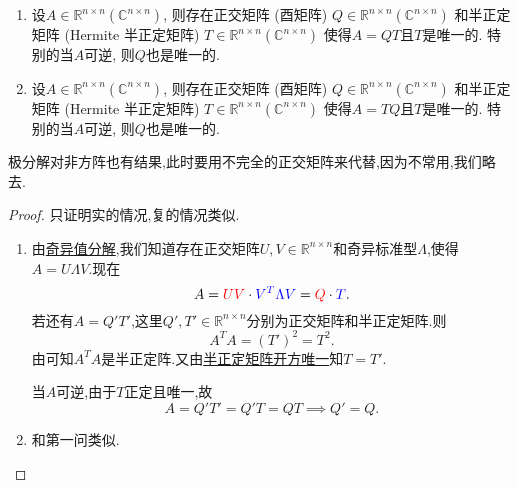 \documentclass[../../main.tex]{subfiles}
\begin{document}
\begin{theorem}[极分解]\label{theorem:极分解}
\begin{enumerate}
\item 设\( A \in \mathbb{R}^{n \times n} (\mathbb{C}^{n \times n}) \), 则存在正交矩阵 (酉矩阵) \( Q \in \mathbb{R}^{n \times n} (\mathbb{C}^{n \times n}) \) 和半正定矩阵 (Hermite 半正定矩阵) \( T \in \mathbb{R}^{n \times n} (\mathbb{C}^{n \times n}) \) 使得\( A = QT \)且\( T \)是唯一的. 特别的当\( A \)可逆, 则\( Q \)也是唯一的.

\item 设\( A \in \mathbb{R}^{n \times n} (\mathbb{C}^{n \times n}) \), 则存在正交矩阵 (酉矩阵) \( Q \in \mathbb{R}^{n \times n} (\mathbb{C}^{n \times n}) \) 和半正定矩阵 (Hermite 半正定矩阵) \( T \in \mathbb{R}^{n \times n} (\mathbb{C}^{n \times n}) \) 使得\( A = TQ \)且\( T \)是唯一的. 特别的当\( A \)可逆, 则\( Q \)也是唯一的.
\end{enumerate}
\end{theorem}
\begin{note}
极分解对非方阵也有结果,此时要用不完全的正交矩阵来代替,因为不常用,我们略去.
\end{note}
\begin{proof}
只证明实的情况,复的情况类似.
\begin{enumerate}
\item 由\hyperref[theorem:奇异值分解]{奇异值分解},我们知道存在正交矩阵\( U, V \in \mathbb{R}^{n \times n} \)和奇异标准型\( \Lambda \),使得\( A = U \Lambda V \).现在
\[
A = {\color{red} UV} \cdot {\color{blue} V^T \Lambda V} = {\color{red} Q} \cdot {\color{blue} T}.
\]
若还有\( A = Q'T' \),这里\( Q', T' \in \mathbb{R}^{n \times n} \)分别为正交矩阵和半正定矩阵.则
\[
A^T A = (T')^2 = T^2.
\]
由可知$A^TA$是半正定阵.又由\hyperref[theorem:半正定矩阵开方唯一]{半正定矩阵开方唯一}知\( T = T' \).

当\( A \)可逆,由于\( T \)正定且唯一,故
\[
A = Q'T' =Q'T= QT \implies Q' = Q.
\]

\item 和第一问类似.
\end{enumerate}

\end{proof}
\end{document}
